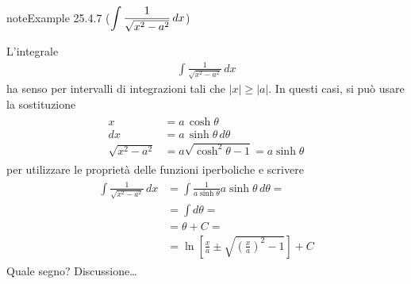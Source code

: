 \documentclass[letterpaper,10pt,italian]{jupyterBook}
\begin{document}
\begin{sphinxadmonition}{note}{Example 25.4.7 (\protect\(\displaystyle \int \frac{1}{\sqrt{x^2 - a^2}} \,  dx\protect\))}



\sphinxAtStartPar
L’integrale
\begin{equation*}
\begin{split}\int \frac{1}{\sqrt{x^2 - a^2}} \,  dx\end{split}
\end{equation*}
\sphinxAtStartPar
ha senso per intervalli di integrazioni tali che \(|x| \ge |a|\). In questi casi, si può usare la sostituzione
\begin{equation*}
\begin{split}\begin{aligned}
   x & = a \, \cosh \theta \\
  dx & = a \, \sinh \theta \, d \theta \\
  \sqrt{x^2 - a^2} & = a \sqrt{\cosh^2 \theta - 1} = a \sinh \theta
\end{aligned}\end{split}
\end{equation*}
\sphinxAtStartPar
per utilizzare le proprietà delle funzioni iperboliche e scrivere
\begin{equation*}
\begin{split}\begin{aligned}
  \int \frac{1}{\sqrt{x^2 - a^2}} \, dx
   & = \int \frac{1}{a \sinh \theta} a \sinh \theta \, d \theta = \\
   & = \int  d \theta = \\
   & = \theta + C = \\
   & = \ln \left[ \frac{x}{a} \pm \sqrt{\left( \frac{x}{a} \right)^2 - 1} \right] + C
\end{aligned}\end{split}
\end{equation*}
\sphinxAtStartPar
{} Quale segno? Discussione… 
\end{sphinxadmonition}
\end{document}
